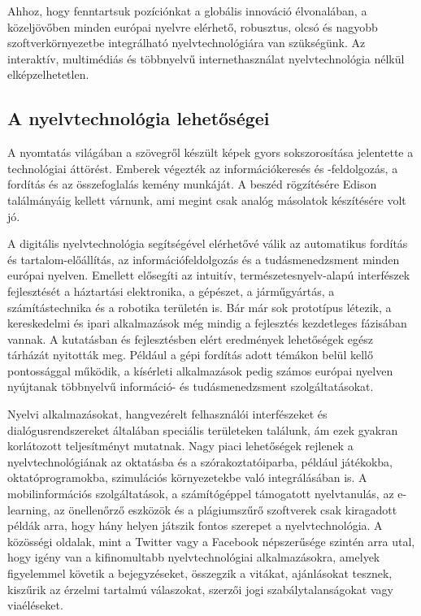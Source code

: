 \begin{multicols}{2}

Ahhoz, hogy fenntartsuk pozíciónkat a globális innováció élvonalában, a kö\-zel\-jö\-vő\-ben minden európai nyelvre elérhető, robusztus, olcsó és nagyobb szoft\-ver\-kör\-nye\-zet\-be integrálható nyelvtechnológiára van szükségünk. Az interaktív, multimédiás és többnyelvű internethasználat nyelvtechnológia nélkül elképzelhetetlen. 

\subsection{A nyelvtechnológia lehetőségei}

A nyomtatás világában a szövegről készült képek gyors sokszorosítása jelentette a technológiai áttörést. Emberek végezték az információkeresés és -feldolgozás, a fordítás és az összefoglalás kemény mun\-ká\-ját. A beszéd rögzítésére Edison ta\-lál\-má\-nyá\-ig kellett várnunk, ami megint csak analóg másolatok készítésére volt jó. 

A digitális nyelvtechnológia segítségével elérhetővé válik az automatikus fordítás és tartalom-előállítás, az információfeldolgozás és a tudásmenedzsment minden európai nyelven. Emellett elősegíti az intuitív, természetesnyelv-alapú interfészek fejlesztését a háztartási elektronika, a gépészet, a járműgyártás, a számítástechnika és a robotika területén is. Bár már sok prototípus létezik, a kereskedelmi és ipari alkalmazások még mindig a fejlesztés kezdetleges fázisában vannak. A kutatásban és fejlesztésben elért eredmények lehetőségek egész tárházát nyitották meg. Például a gépi fordítás adott témákon belül kellő pontossággal működik, a kísérleti alkalmazások pedig számos európai nyelven nyújtanak többnyelvű információ- és tudásmenedzsment szolgáltatásokat. 

Nyelvi alkalmazásokat, hangvezérelt felhasználói interfészeket és dialógusrendszereket általában speciális területeken találunk, ám ezek gyakran korlátozott teljesítményt mutatnak. Nagy piaci le\-he\-tő\-sé\-gek rejlenek a nyelvtechnológiának az oktatásba és a szórakoztatóiparba, például játékokba, oktatóprogramokba, szimulációs környezetekbe való in\-teg\-rá\-lá\-sá\-ban is. A mobilinformációs szolgáltatások, a számítógéppel támogatott nyelvtanulás, az e-learning, az önellenőrző esz\-kö\-zök és a plágiumszűrő szoftverek csak kiragadott példák arra, hogy hány helyen játszik fontos szerepet a nyelvtechnológia. A közösségi oldalak, mint a Twitter vagy a Facebook népszerűsége szintén arra utal, hogy igény van a kifinomultabb nyelvtechnológiai alkalmazásokra, amelyek figyelemmel követik a bejegyzéseket, összegzik a vitákat, ajánlásokat tesznek, kiszűrik az érzelmi tartalmú válaszokat, szerzői jogi szabálytalanságokat vagy via\-élé\-se\-ket. 


\end{multicols}
